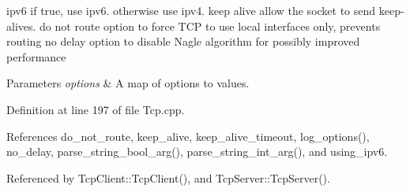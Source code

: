 ipv6 if true, use ipv6. otherwise use ipv4. keep alive allow the socket to send keep-\/alives. do not route option to force TCP to use local interfaces only, prevents routing no delay option to disable Nagle algorithm for possibly improved performance


\begin{DoxyParams}{Parameters}
{\em options} & A map of options to values. \\
\hline
\end{DoxyParams}


Definition at line 197 of file Tcp.cpp.



References do\_\-not\_\-route, keep\_\-alive, keep\_\-alive\_\-timeout, log\_\-options(), no\_\-delay, parse\_\-string\_\-bool\_\-arg(), parse\_\-string\_\-int\_\-arg(), and using\_\-ipv6.



Referenced by TcpClient::TcpClient(), and TcpServer::TcpServer().


